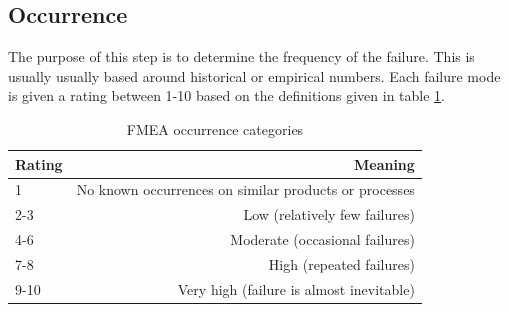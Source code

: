\subsection{Occurrence}
\label{sec:fmea_occurrence}
The purpose of this step is to determine the frequency of the failure. This is usually usually based around historical or empirical numbers. Each failure mode is given a rating between 1-10 based on the definitions given in table \ref{table:fmea_occurrence}.

\begin{table}[h]
\centering
    \begin{tabular}{ | l | r | }
    \hline
    Rating & Meaning \\ \hline \hline
    1      & No known occurrences on similar products or processes  \\ \hline
    2-3    & Low (relatively few failures) \\ \hline
    4-6    & Moderate (occasional failures) \\ \hline
    7-8    & High (repeated failures) \\ \hline
    9-10   & Very high (failure is almost inevitable) \\ \hline
    \end{tabular}
\caption{FMEA occurrence categories}
\label{table:fmea_occurrence}
\end{table}

